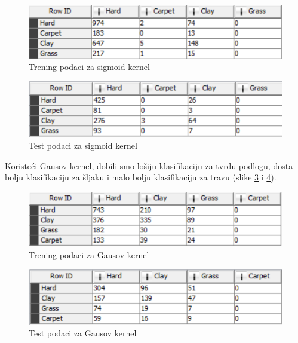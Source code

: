 \documentclass[a4paper]{article}
\begin{document}
\begin{figure}[h!]
	\begin{center}
		\includegraphics[scale=0.6]{KNIME_project/SVM/sigmoid_training}
	\end{center}
	\caption{Trening podaci za sigmoid kernel}
	\label{fig:sigmoid_training}
\end{figure}

\begin{figure}[h!]
	\begin{center}
		\includegraphics[scale=0.6]{KNIME_project/SVM/sigmoid_test}
	\end{center}
	\caption{Test podaci za sigmoid kernel}
	\label{fig:sigmoid_test}
\end{figure}

Koristeći Gausov kernel, dobili smo lošiju klasifikaciju za tvrdu podlogu, dosta bolju klasifikaciju za šljaku
i malo bolju klasifikaciju za travu (slike \ref{fig:rbf_training} i \ref{fig:rbf_test}). \\

\begin{figure}[h!]
	\begin{center}
		\includegraphics[scale=0.6]{KNIME_project/SVM/rbf_training}
	\end{center}
	\caption{Trening podaci za Gausov kernel}
	\label{fig:rbf_training}
\end{figure}

\begin{figure}[h!]
\begin{center}
	\includegraphics[scale=0.6]{KNIME_project/SVM/rbf_test}
\end{center}
\caption{Test podaci za Gausov kernel}
\label{fig:rbf_test}
\end{figure}
\end{document}
